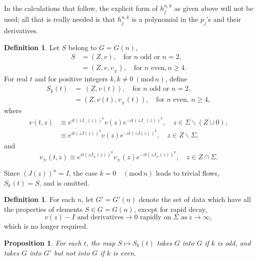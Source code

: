 \documentclass{surv-l}
\theoremstyle{plain}
\newtheorem{prop}[theorem]{Proposition}
\theoremstyle{definition}
\newtheorem{definition}[theorem]{Definition}
\numberwithin{equation}{chapter}
\begin{document}
In the calculations that follow, the explicit form of $h_{j}^{n,k}$ as given above will not be used; all that is really needed is that $h_{j}^{n,k}$ is a polynomial in the $p_{j}$'s and their derivatives.
\renewcommand\thetheorem{35.\arabic{theorem}}
\setcounter{theorem}{1}
\begin{definition}\label{defi35.2}
Let $S$ belong to $G=G(n)$,
\begin{align*}
S &=(Z, v),\quad \text{for } n\text{ odd or } n=2,\\
&=(Z, v, v_{\pm}),\quad \text{for } n \text{ even}, n\geq 4.
\end{align*}
For real $t$ and for positive integers $k, k\neq 0\ (\mathrm{mod}\, n)$, define
\setcounter{equation}{2}
\begin{align}\label{eq35.3}
S_{k}(t)&=\ (Z, v(t)),\quad \text{for } n \text{ odd or } n=2,\\
&= (Z, v(t), v_{\pm}(t)),\quad \text{for } n \text{ even},\, n\geq 4,\nonumber
\end{align}
where
\begin{align}\label{eq35.4}
v(t, z)&\equiv e^{it(zJ_{-}(z))^{k}}v(z)e^{-it(zJ_{-}(z))^{k}},\quad z\in\Sigma\backslash (Z\cup 0),\\
&\equiv e^{it(zJ(z))^{k}}v(z)e^{-it(zJ(z))^{k}},\quad z\in Z\backslash \Sigma,\nonumber
\end{align}
and
\begin{equation}\label{eq35.5}
v_{\pm}(t, z)\equiv e^{it(zJ_{\pm}(z))^{k}}v_{\pm}(z)e^{-it(zJ_{\pm}(z))^{k}},\quad  z\in Z\cap\Sigma.
\end{equation}

Since $(J(z))^{n}=I$, the case $k=0\quad(\mathrm{mod}\, n)$ leads to trivial flows, $S_{k}(t)=S$, and is omitted.
\end{definition}
\setcounter{theorem}{5}
\begin{definition}\label{defi35.6} For each $n$, let $G'=G'(n)$ denote the set of data which have all the properties of elements $S\in G=G(n)$, except for rapid decay,
\setcounter{equation}{6}
\begin{equation}\label{eq35.7}
v(z)-I \text{ and derivatives} \rightarrow 0\text{ rapidly on $\Sigma$ as}\ z\rightarrow\infty,
\end{equation}
which is no longer required.
\end{definition}
\setcounter{theorem}{7}
\begin{prop}\label{prop35.8}
For each $t$, the map $S\mapsto {S}_{k}(t)$ takes $G$ into $G$ if $k$ is odd, and takes $G$ into $G'$ but not into $G$ if $k$ is even.
\end{prop}
\end{document}

